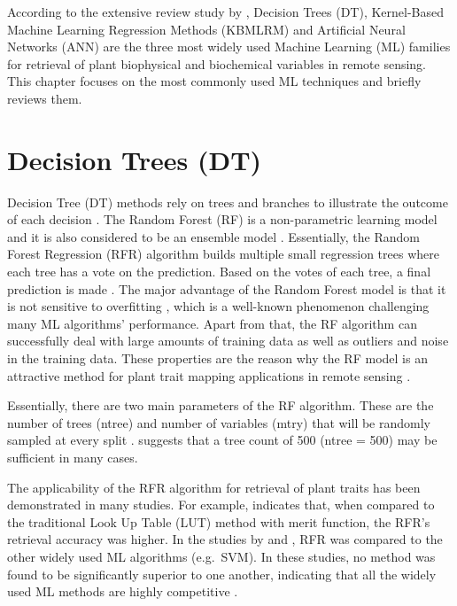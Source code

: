 \documentclass[a4paper, twoside]{templates/ociamthesis}
\begin{document}
According to the extensive review study by \citet{verrelst2019quantifying}, Decision Trees (DT), Kernel-Based Machine Learning Regression Methods (KBMLRM) and Artificial Neural Networks (ANN) are the three most widely used Machine Learning (ML) families for retrieval of plant biophysical and biochemical variables in remote sensing. This chapter focuses on the most commonly used ML techniques and briefly reviews them.

\hypertarget{dt}{%
\section{Decision Trees (DT)}\label{dt}}

Decision Tree (DT) methods rely on trees and branches to illustrate the outcome of each decision \citep{verrelst2019quantifying}. The Random Forest (RF) is a non-parametric learning model and it is also considered to be an ensemble model \citep{breiman2001random}. Essentially, the Random Forest Regression (RFR) algorithm builds multiple small regression trees where each tree has a vote on the prediction. Based on the votes of each tree, a final prediction is made \citep{breiman2001random, powell2010quantification}. The major advantage of the Random Forest model is that it is not sensitive to overfitting \citep{breiman2001random, powell2010quantification, verrelst2019quantifying}, which is a well-known phenomenon challenging many ML algorithms' performance. Apart from that, the RF algorithm can successfully deal with large amounts of training data as well as outliers and noise in the training data. These properties are the reason why the RF model is an attractive method for plant trait mapping applications in remote sensing \citep{verrelst2019quantifying}.

Essentially, there are two main parameters of the RF algorithm. These are the number of trees (ntree) and number of variables (mtry) that will be randomly sampled at every split \citep{wang2018estimation}. \citet{breiman2001random} suggests that a tree count of 500 (ntree = 500) may be sufficient in many cases.

The applicability of the RFR algorithm for retrieval of plant traits has been demonstrated in many studies. For example, \citet{ali2020machine} indicates that, when compared to the traditional Look Up Table (LUT) method with merit function, the RFR's retrieval accuracy was higher. In the studies by \citet{han2016hyperspectral} and \citet{pullanagari2016mapping}, RFR was compared to the other widely used ML algorithms (e.g.~SVM). In these studies, no method was found to be significantly superior to one another, indicating that all the widely used ML methods are highly competitive \citep{verrelst2019quantifying}.
\end{document}

